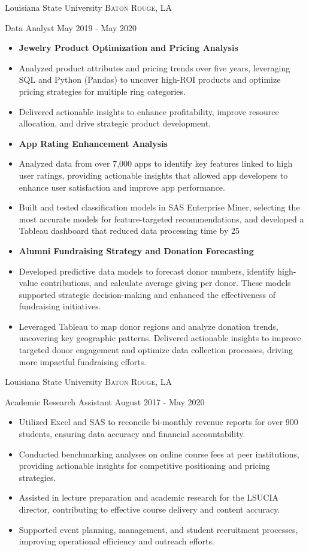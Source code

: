 \documentclass[10pt,a4paper]{article}
\begin{document}
\headedsection
{Louisiana State University}
{{\small \textsc{Baton Rouge, LA}}}
{
  \headedsubsection
  {Data Analyst}
  {May 2019 - May 2020}
  {
    \begin{itemize}
      \item[] \textbf{Jewelry Product Optimization and Pricing Analysis}
      \item Analyzed product attributes and pricing trends over five years, leveraging SQL and Python (Pandas) to uncover high-ROI products and optimize pricing strategies for multiple ring categories.
       \item Delivered actionable insights to enhance profitability, improve resource allocation, and drive strategic product development.
        \item[] \textbf{App Rating Enhancement Analysis}
        \item Analyzed data from over 7,000 apps to identify key features linked to high user ratings, providing actionable insights that allowed app developers to enhance user satisfaction and improve app performance.
        \item Built and tested classification models in SAS Enterprise Miner, selecting the most accurate models for feature-targeted recommendations, and developed a Tableau dashboard that reduced data processing time by 25%
        \item[] \textbf{Alumni Fundraising Strategy and Donation Forecasting}
        \item Developed predictive data models to forecast donor numbers, identify high-value contributions, and calculate average giving per donor. These models supported strategic decision-making and enhanced the effectiveness of fundraising initiatives.
        \item Leveraged Tableau to map donor regions and analyze donation trends, uncovering key geographic patterns. Delivered actionable insights to improve targeted donor engagement and optimize data collection processes, driving more impactful fundraising efforts.
     \end{itemize}
  }
}

\headedsection
{Louisiana State University}
{{\small \textsc{Baton Rouge, LA}}}
{
  \headedsubsection
  {Academic Research Assistant}
  {August 2017 - May 2020}
  {
    \begin{itemize}
      \item Utilized Excel and SAS to reconcile bi-monthly revenue reports for over 900 students, ensuring data accuracy and financial accountability.
      \item Conducted benchmarking analyses on online course fees at peer institutions, providing actionable insights for competitive positioning and pricing strategies.
      \item Assisted in lecture preparation and academic research for the LSUCIA director, contributing to effective course delivery and content accuracy.
      \item Supported event planning, management, and student recruitment processes, improving operational efficiency and outreach efforts.
    \end{itemize}
  }
}
\end{document}
